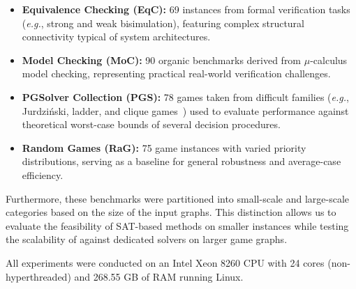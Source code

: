 \documentclass[a4paper,fleqn]{cas-sc}
\begin{document}
\begin{itemize}
\item \textbf{Equivalence Checking (EqC):} 69 instances from formal verification tasks ({\em e.g.}, strong and weak bisimulation), featuring complex structural connectivity typical of system architectures.
\item \textbf{Model Checking (MoC):} 90 organic benchmarks derived from $\mu$-calculus model checking, representing practical real-world verification challenges.
\item \textbf{PGSolver Collection (PGS):} 78 games taken from difficult families ({\em e.g.}, Jurdziński, ladder, and clique games~\cite{Benerecetti:2016}) used to evaluate performance against theoretical worst-case bounds of several decision procedures.
\item \textbf{Random Games (RaG):} 75 game instances with varied priority distributions, serving as a baseline for general robustness and average-case efficiency.
\end{itemize}

Furthermore, these benchmarks were partitioned into small-scale and large-scale categories based on the size of the input graphs. This distinction allows us to evaluate the feasibility of SAT-based methods on smaller instances while testing the scalability of \nooppc against dedicated solvers on larger game graphs. 

All experiments were conducted on an Intel Xeon 8260 CPU with 24 cores (non-hyperthreaded) and 268.55 GB of RAM running Linux.
\end{document}
